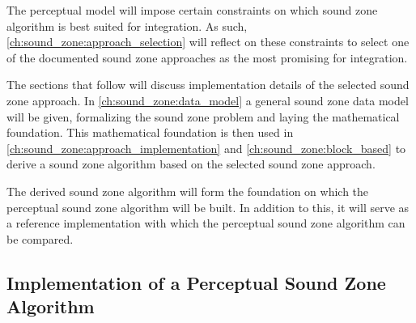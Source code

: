 The perceptual model will impose certain constraints on which sound zone algorithm is best suited for integration.
As such, \autoref{ch:sound_zone:approach_selection} will reflect on these constraints to select one of the documented
sound zone approaches as the most promising for integration.

The sections that follow will discuss implementation details of the selected sound zone approach.
In \autoref{ch:sound_zone:data_model} a general sound zone data model will be given, formalizing the sound zone problem
and laying the mathematical foundation.
This mathematical foundation is then used in \autoref{ch:sound_zone:approach_implementation} and 
\autoref{ch:sound_zone:block_based} to derive a sound zone algorithm based on the selected sound zone approach.

The derived sound zone algorithm will form the foundation on which the perceptual sound zone algorithm will be built.
In addition to this, it will serve as a reference implementation with which the perceptual sound zone algorithm
can be compared.

\subsection{Implementation of a Perceptual Sound Zone Algorithm}
\label{ch:introduction:objectives:perceptual_sound_zone}
